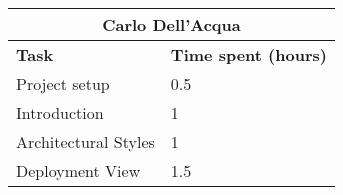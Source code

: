\begin{table}[h]
  \centering
  \begin{tabular}{l|l}
    \multicolumn{2}{c}{\textbf{Carlo Dell'Acqua}} \\
    \hline
    \textbf{Task} & \textbf{Time spent (hours)}\\
    \hline
    Project setup & 0.5 \\
    Introduction & 1 \\
    Architectural Styles & 1 \\
    Deployment View & 1.5 \\
  \end{tabular}
\end{table}